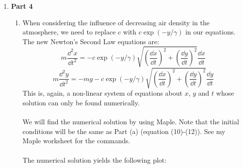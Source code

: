 \documentclass{article}
\begin{document}
\begin{enumerate}
  The terminal speed can be calculated as following:
  \begin{equation}
    mg = c |v_y|^2
  \end{equation}
  \begin{equation}
    |v_y| = \sqrt{\frac{mg}{c}}  =v_{ter} = 28.5ms^{-1}
  \end{equation}
  (using equation (20)). Indeed, as well can see on the plot, \(\dot{y}(t)\to -28.5ms^{-1}\) as time increases. \\
  \\
  The time when the vertical velocity reaches \(95\%\) of the terminal velocity can be found numerically by using Maple. See my Maple worksheet for the commands.\\
  \\
  The time when the vertical velocity reaches \(95\%\) of the terminal velocity is found to be:
  \begin{equation}
    t_{95} = 7.45s
  \end{equation}
  \pagebreak \\ \\
  \item \textbf{Part 4}
  \begin{enumerate}
    \item When considering the influence of decreasing air density in the atmosphere, we need to replace \(c\)
    with \(c\exp(-y/\gamma)\) in our equations. The new Newton's Second Law equations are:
    \begin{equation}
       m \frac{\dd^2x}{\dd t^2}  = -c\exp(-y/\gamma) \sqrt{\left(\frac{\dd x}{\dd t}\right)^2 + \left(\frac{\dd y}{\dd t}\right)^2 } \frac{\dd x}{\dd t}
    \end{equation}
    \begin{equation}
      m \frac{\dd^2y}{\dd t^2} = -mg -c\exp(-y/\gamma) \sqrt{\left(\frac{\dd x}{\dd t}\right)^2 + \left(\frac{\dd y}{\dd t}\right)^2 } \frac{\dd y}{\dd t}
    \end{equation}
    This is, again, a non-linear system of equations about \(x\), \(y\) and \(t\) whose solution can only be found numerically.\\
    \\
    We will find the numerical solution by using Maple. Note that the initial conditions will be the same as Part (a)
    (equation (10)-(12)). See my Maple worksheet for the commands. \\
    \\
    The numerical solution yields the following plot:
    \begin{figure}[ht]

\end{figure}
\end{enumerate}
\end{enumerate}
\end{document}
